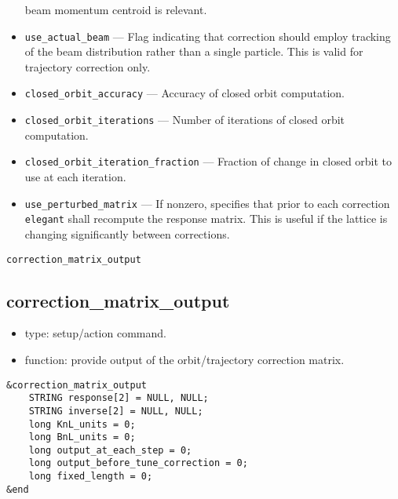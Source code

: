 \documentclass[11pt]{article}
\begin{document}
\begin{itemize}
beam momentum centroid is relevant.
\item \verb|use_actual_beam| --- Flag indicating that correction
should employ tracking of the beam distribution rather than a single
particle.  This is valid for trajectory correction only.
\item \verb|closed_orbit_accuracy| --- Accuracy of closed orbit computation.
\item \verb|closed_orbit_iterations| --- Number of iterations of closed orbit computation.
\item \verb|closed_orbit_iteration_fraction| --- Fraction of change in closed orbit to
use at each iteration.
\item \verb|use_perturbed_matrix| --- If nonzero, specifies that prior to each 
	correction \verb|elegant| shall recompute the response matrix.  This
	is useful if the lattice is changing significantly between corrections.
\end{itemize}

\begin{latexonly}
\newpage
\begin{center}{\Large\verb|correction_matrix_output|}\end{center}
\end{latexonly}
\subsection{correction\_matrix\_output \label{subsec:correctionmatrixoutput}}

\begin{itemize}
\item type: setup/action command.
\item function: provide output of the orbit/trajectory correction matrix.
\end{itemize}

\begin{verbatim}
&correction_matrix_output
    STRING response[2] = NULL, NULL;
    STRING inverse[2] = NULL, NULL;
    long KnL_units = 0;
    long BnL_units = 0;
    long output_at_each_step = 0;
    long output_before_tune_correction = 0;
    long fixed_length = 0;
&end
\end{verbatim}
\end{document}
